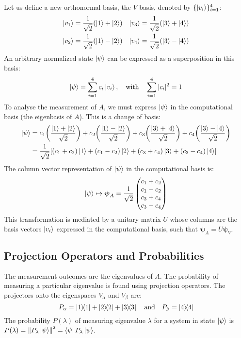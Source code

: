 \documentclass[11pt,a4paper]{article}
\begin{document}
Let us define a new orthonormal basis, the $V$-basis, denoted by $\{\ket{v_i}\}_{i=1}^4$:
\begin{align*}
  \ket{v_1} &= \frac{1}{\sqrt{2}}(\ket{1} + \ket{2}) & \ket{v_3} &=
    \frac{1}{\sqrt{2}}(\ket{3} + \ket{4}) \\
  \ket{v_2} &= \frac{1}{\sqrt{2}}(\ket{1} - \ket{2}) & \ket{v_4} &=
    \frac{1}{\sqrt{2}}(\ket{3} - \ket{4})
\end{align*}
An arbitrary normalized state $\ket{\psi}$ can be expressed as a superposition
in this basis:
$$
\ket{\psi} = \sum_{i=1}^{4} c_i \ket{v_i}, \quad \text{with} \quad
\sum_{i=1}^{4} |c_i|^2 = 1
$$
To analyse the measurement of $A$, we must express $\ket{\psi}$ in the
computational basis (the eigenbasis of $A$). This is a change of basis:
\begin{align*}
  \ket{\psi} &= c_1 \qty( \frac{\ket{1} + \ket{2}}{\sqrt{2}} ) + c_2 \qty(
    \frac{\ket{1} - \ket{2}}{\sqrt{2}} ) + c_3 \qty( \frac{\ket{3} +
    \ket{4}}{\sqrt{2}} ) + c_4 \qty( \frac{\ket{3} - \ket{4}}{\sqrt{2}} ) \\
             &= \frac{1}{\sqrt{2}} \qty[ (c_1+c_2)\ket{1} + (c_1-c_2)\ket{2} +
             (c_3+c_4)\ket{3} + (c_3-c_4)\ket{4} ]
\end{align*}
The column vector representation of $\ket{\psi}$ in the computational basis is:
$$
\ket{\psi} \mapsto \boldsymbol{\psi}_{A} = \frac{1}{\sqrt{2}}
\begin{pmatrix}
  c_1 + c_2 \\
  c_1 - c_2 \\
  c_3 + c_4 \\
  c_3 - c_4
\end{pmatrix}
$$
This transformation is mediated by a unitary matrix $U$ whose columns are the
basis vectors $\ket{v_i}$ expressed in the computational basis, such that
$\boldsymbol{\psi}_A = U \boldsymbol{\psi}_V$.

\subsection{Projection Operators and Probabilities}

The measurement outcomes are the eigenvalues of $A$. The probability of
measuring a particular eigenvalue is found using projection operators. The
projectors onto the eigenspaces $V_\alpha$ and $V_\beta$ are:
$$
P_\alpha = \dyad{1}{1} + \dyad{2}{2} + \dyad{3}{3} \quad \text{and} \quad
P_\beta = \dyad{4}{4}
$$
The probability $P(\lambda)$ of measuring eigenvalue $\lambda$ for a system in
state $\ket{\psi}$ is $P(\lambda) = \norm{P_\lambda \ket{\psi}}^2 = \bra{\psi}
P_\lambda \ket{\psi}$.
\end{document}
